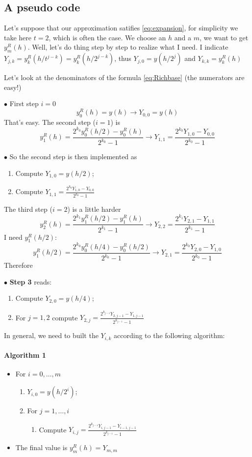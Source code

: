 \documentclass[10pt,a4paper,twoside]{article}
\begin{document}
  \subsection{A pseudo code}
  Let's suppose that our approximation satifies \eqref{eq:expansion}, for simplicity we take here $t=2$, which is often the case. We choose an $h$ and a $m$, we want to get $y^R_m(h)$.
  Well, let's do thing step by step to realize what I need. I indicate $Y_{j,k}=y^R_k(h/t^{j-k})=y^R_k(h/2^{j-k})$, thus $Y_{j,0}=y(h/2^j)$ and $Y_{k,k}=y^R_k(h)$
 
  Let's look at the denominators of the formula \eqref{eq:Richbase} (the numerators are easy!)
  
\noindent$\bullet$ First step $i=0$
  \[
  y^R_0(h)=y(h) \rightarrow Y_{0,0}=y(h)
  \]
  That's easy. 
  The second step ($i=1$) is
  \[
  y^R_1(h)=\frac{2^{k_0}y^R_0(h/2)-y^R_0(h)}{2^{k_0}-1} \rightarrow Y_{1,1}=\frac{2^{k_0}Y_{1,0}-Y_{0,0}}{2^{k_0}-1}
  \]
  
\noindent$\bullet$ So the second step is then implemented as
  \begin{enumerate}
      \item Compute $Y_{1,0}=y(h/2)$;
      \item Compute $Y_{1,1}=\frac{2^{k_0}Y_{1,0}-Y_{0,0}}{2^{k_0}-1}$
  \end{enumerate}
  
The third  step ($i=2$) is a little harder
 \[
 y^R_2(h)=\frac{2^{k_1}y^R_1(h/2)-y^R_1(h)}{2^{k_1}-1} \rightarrow Y_{2,2}=\frac{2^{k_1}Y_{2,1}-Y_{1,1}}{2^{k_1}-1}
 \]
I need $y^R_1(h/2)$:
\[
y^R_1(h/2)=\frac{2^{k_0}y^R_0(h/4)-y^R_0(h/2)}{2^{k_0}-1}\rightarrow Y_{2,1}=\frac{2^{k_0}Y_{2,0}-Y_{1,0}}{2^{k_0}-1}
\]
Therefore 

$\bullet$ \textbf{Step 3} reads:
\begin{enumerate}
    \item Compute $Y_{2,0}=y(h/4)$;
    \item For $j=1,2$ compute $Y_{2,j}=\frac{2^{k_{j-1}}Y_{2,j-1}-Y_{1,j-1}}{2^{k_{j-1}}-1}$
\end{enumerate}
 
    
In general, we need to built the $Y_{i,k}$ according to  the following algorithm:
\paragraph{Algorithm 1}
\begin{itemize}
    \item For $i=0,\ldots,m$
    \begin{enumerate}
        \item $Y_{i,0}=y(h/2^i)$;
        \item For $j=1,\ldots,i$
        \begin{enumerate}
            \item Compute $Y_{i,j}=\frac{2^{k_{j-1}}Y_{i,j-1}-Y_{i-1,j-1}}{2^{k_{j-1}}-1}$
        \end{enumerate}
    \end{enumerate}
\item The final value is $y^R_m(h)=Y_{m,m}$
\end{itemize}
     
\end{document}
